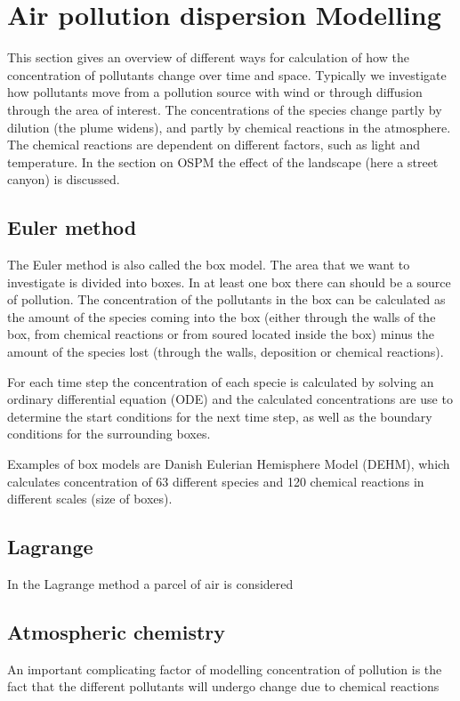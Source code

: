 \section{Air pollution dispersion Modelling}
This section gives an overview of different ways for calculation of how the concentration of pollutants change over time and space. Typically we investigate how pollutants move from a pollution source with wind or through diffusion through the area of interest. The concentrations of the species change partly by dilution (the plume widens), and partly by chemical reactions in the atmosphere. The chemical reactions are dependent on different factors, such as light and temperature. In the section on OSPM the effect of the landscape (here a street canyon) is discussed.

\subsection{Euler method}
The Euler method is also called the box model. The area that we want to investigate is divided into boxes. In at least one box there can should be a source of pollution. The concentration of the pollutants in the box can be calculated as the amount of the species coming into the box (either through the walls of the box, from chemical reactions or from soured located inside the box) minus the amount of the species lost (through the walls, deposition or chemical reactions).

For each time step the concentration of each specie is calculated by solving an ordinary differential equation (ODE) and the calculated concentrations are use to determine the start conditions for the next time step, as well as the boundary conditions for the surrounding boxes.

Examples of box models are Danish Eulerian Hemisphere Model (DEHM), which calculates concentration of 63 different species and 120 chemical reactions in different scales (size of boxes).

\subsection{Lagrange}
In the Lagrange method a parcel of air is considered  

\subsection{Atmospheric chemistry}
An important complicating factor of modelling concentration of pollution is the fact that the different pollutants will undergo change due to chemical reactions


